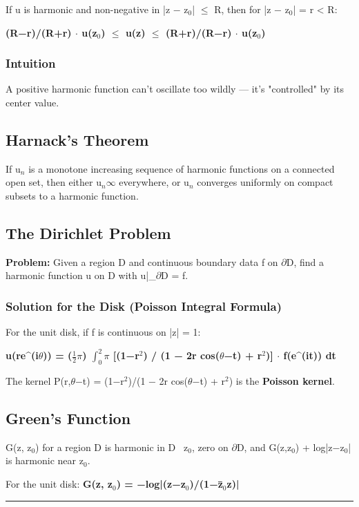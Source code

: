 \documentclass[12pt,a4paper,openany]{book}
\begin{document}
{{If u is harmonic and non-negative in |z − z$_0$| $\leq$ R, then for |z − z$_0$| = r < R:

\textbf{(R−r)/(R+r) $\cdot$ u(z$_0$) $\leq$ u(z) $\leq$ (R+r)/(R−r) $\cdot$ u(z$_0$)}

\subsubsection{Intuition}
A positive harmonic function can't oscillate too wildly — it's "controlled" by its center value.

\subsection{Harnack's Theorem}
If {u$_n$} is a monotone increasing sequence of harmonic functions on a connected open set, then either u$_n\infty$ everywhere, or u$_n$ converges uniformly on compact subsets to a harmonic function.

\subsection{The Dirichlet Problem}

\textbf{Problem:} Given a region D and continuous boundary data f on $\partial$D, find a harmonic function u on D with u|_{$\partial$D} = f.

\subsubsection{Solution for the Disk (Poisson Integral Formula) }
For the unit disk, if f is continuous on |z| = 1:

\textbf{u(re^(i$\theta$)) = ($\frac{1}{2}$$\pi$) $\int_0^2\pi$ [(1−r$^2$) / (1 − 2r cos($\theta$−t) + r$^2$)] $\cdot$ f(e^(it)) dt}

The kernel P(r,$\theta$−t) = (1−r$^2$)/(1 − 2r cos($\theta$−t) + r$^2$) is the \textbf{Poisson kernel}.

\subsection{Green's Function}
G(z, z$_0$) for a region D is harmonic in D \ {z$_0$}, zero on $\partial$D, and G(z,z$_0$) + log|z−z$_0$| is harmonic near z$_0$.

For the unit disk: \textbf{G(z, z$_0$) = −log|(z−z$_0$)/(1−z̄$_0$z)|}

\bigskip\noindent\rule{\textwidth}{0.4pt}\bigskip

}}
\end{document}
